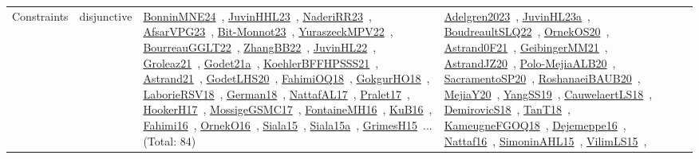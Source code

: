 {\begin{longtable}{lp{3cm}>{\raggedright\arraybackslash}p{6cm}>{\raggedright\arraybackslash}p{6cm}>{\raggedright\arraybackslash}p{8cm}}
Constraints & disjunctive & \href{../works/BonninMNE24.pdf}{BonninMNE24}~\cite{BonninMNE24}, \href{../works/JuvinHHL23.pdf}{JuvinHHL23}~\cite{JuvinHHL23}, \href{../works/NaderiRR23.pdf}{NaderiRR23}~\cite{NaderiRR23}, \href{../works/AfsarVPG23.pdf}{AfsarVPG23}~\cite{AfsarVPG23}, \href{../works/Bit-Monnot23.pdf}{Bit-Monnot23}~\cite{Bit-Monnot23}, \href{../works/YuraszeckMPV22.pdf}{YuraszeckMPV22}~\cite{YuraszeckMPV22}, \href{../works/BourreauGGLT22.pdf}{BourreauGGLT22}~\cite{BourreauGGLT22}, \href{../works/ZhangBB22.pdf}{ZhangBB22}~\cite{ZhangBB22}, \href{../works/JuvinHL22.pdf}{JuvinHL22}~\cite{JuvinHL22}, \href{../works/Groleaz21.pdf}{Groleaz21}~\cite{Groleaz21}, \href{../works/Godet21a.pdf}{Godet21a}~\cite{Godet21a}, \href{../works/KoehlerBFFHPSSS21.pdf}{KoehlerBFFHPSSS21}~\cite{KoehlerBFFHPSSS21}, \href{../works/Astrand21.pdf}{Astrand21}~\cite{Astrand21}, \href{../works/GodetLHS20.pdf}{GodetLHS20}~\cite{GodetLHS20}, \href{../works/FahimiOQ18.pdf}{FahimiOQ18}~\cite{FahimiOQ18}, \href{../works/GokgurHO18.pdf}{GokgurHO18}~\cite{GokgurHO18}, \href{../works/LaborieRSV18.pdf}{LaborieRSV18}~\cite{LaborieRSV18}, \href{../works/German18.pdf}{German18}~\cite{German18}, \href{../works/NattafAL17.pdf}{NattafAL17}~\cite{NattafAL17}, \href{../works/Pralet17.pdf}{Pralet17}~\cite{Pralet17}, \href{../works/HookerH17.pdf}{HookerH17}~\cite{HookerH17}, \href{../works/MossigeGSMC17.pdf}{MossigeGSMC17}~\cite{MossigeGSMC17}, \href{../works/FontaineMH16.pdf}{FontaineMH16}~\cite{FontaineMH16}, \href{../works/KuB16.pdf}{KuB16}~\cite{KuB16}, \href{../works/Fahimi16.pdf}{Fahimi16}~\cite{Fahimi16}, \href{../works/OrnekO16.pdf}{OrnekO16}~\cite{OrnekO16}, \href{../works/Siala15.pdf}{Siala15}~\cite{Siala15}, \href{../works/Siala15a.pdf}{Siala15a}~\cite{Siala15a}, \href{../works/GrimesH15.pdf}{GrimesH15}~\cite{GrimesH15}... (Total: 84) & \href{../works/Adelgren2023.pdf}{Adelgren2023}~\cite{Adelgren2023}, \href{../works/JuvinHL23a.pdf}{JuvinHL23a}~\cite{JuvinHL23a}, \href{../works/BoudreaultSLQ22.pdf}{BoudreaultSLQ22}~\cite{BoudreaultSLQ22}, \href{../works/OrnekOS20.pdf}{OrnekOS20}~\cite{OrnekOS20}, \href{../works/Astrand0F21.pdf}{Astrand0F21}~\cite{Astrand0F21}, \href{../works/GeibingerMM21.pdf}{GeibingerMM21}~\cite{GeibingerMM21}, \href{../works/AstrandJZ20.pdf}{AstrandJZ20}~\cite{AstrandJZ20}, \href{../works/Polo-MejiaALB20.pdf}{Polo-MejiaALB20}~\cite{Polo-MejiaALB20}, \href{../works/SacramentoSP20.pdf}{SacramentoSP20}~\cite{SacramentoSP20}, \href{../works/RoshanaeiBAUB20.pdf}{RoshanaeiBAUB20}~\cite{RoshanaeiBAUB20}, \href{../works/MejiaY20.pdf}{MejiaY20}~\cite{MejiaY20}, \href{../works/YangSS19.pdf}{YangSS19}~\cite{YangSS19}, \href{../works/CauwelaertLS18.pdf}{CauwelaertLS18}~\cite{CauwelaertLS18}, \href{../works/DemirovicS18.pdf}{DemirovicS18}~\cite{DemirovicS18}, \href{../works/TanT18.pdf}{TanT18}~\cite{TanT18}, \href{../works/KameugneFGOQ18.pdf}{KameugneFGOQ18}~\cite{KameugneFGOQ18}, \href{../works/Dejemeppe16.pdf}{Dejemeppe16}~\cite{Dejemeppe16}, \href{../works/Nattaf16.pdf}{Nattaf16}~\cite{Nattaf16}, \href{../works/SimoninAHL15.pdf}{SimoninAHL15}~\cite{SimoninAHL15}, \href{../works/VilimLS15.pdf}{VilimLS15}~\cite{VilimLS15}, 
\end{longtable}}
